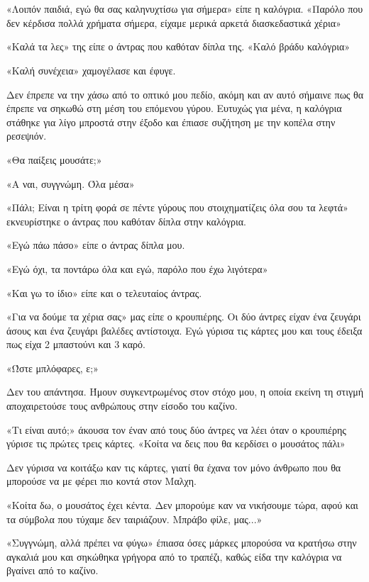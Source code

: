 \documentclass[12pt,twoside, openany]{book}
\begin{document}
\chapter{}

«Λοιπόν παιδιά, εγώ θα σας καληνυχτίσω για σήμερα» είπε η καλόγρια. «Παρόλο που δεν κέρδισα πολλά χρήματα σήμερα, είχαμε μερικά αρκετά διασκεδαστικά χέρια»

«Καλά τα λες» της είπε ο άντρας που καθόταν δίπλα της. «Καλό βράδυ καλόγρια»

«Καλή συνέχεια» χαμογέλασε και έφυγε.

Δεν έπρεπε να την χάσω από το οπτικό μου πεδίο, ακόμη και αν αυτό σήμαινε πως θα έπρεπε να σηκωθώ στη μέση του επόμενου γύρου. Ευτυχώς για μένα, η καλόγρια στάθηκε για λίγο μπροστά στην έξοδο και έπιασε συζήτηση με την κοπέλα στην ρεσεψιόν.

«Θα παίξεις μουσάτε;»

«Α ναι, συγγνώμη. Όλα μέσα»

«Πάλι; Είναι η τρίτη φορά σε πέντε γύρους που στοιχηματίζεις όλα σου τα λεφτά» εκνευρίστηκε ο άντρας που καθόταν δίπλα στην καλόγρια.

«Εγώ πάω πάσο» είπε ο άντρας δίπλα μου.

«Εγώ όχι, τα ποντάρω όλα και εγώ, παρόλο που έχω λιγότερα»

«Και γω το ίδιο» είπε και ο τελευταίος άντρας.

«Για να δούμε τα χέρια σας» μας είπε ο κρουπιέρης. Οι δύο άντρες είχαν ένα ζευγάρι άσους και ένα ζευγάρι βαλέδες αντίστοιχα. Εγώ γύρισα τις κάρτες μου και τους έδειξα πως είχα 2 μπαστούνι και 3 καρό.

«Ώστε μπλόφαρες, ε;»

Δεν του απάντησα. Ήμουν συγκεντρωμένος στον στόχο μου, η οποία εκείνη τη στιγμή αποχαιρετούσε τους ανθρώπους στην είσοδο του καζίνο.

«Τι είναι αυτό;» άκουσα τον έναν από τους δύο άντρες να λέει όταν ο κρουπιέρης γύρισε τις πρώτες τρεις κάρτες. «Κοίτα να δεις που θα κερδίσει ο μουσάτος πάλι»

Δεν γύρισα να κοιτάξω καν τις κάρτες, γιατί θα έχανα τον μόνο άνθρωπο που θα μπορούσε να με φέρει πιο κοντά στον Μαλχη.

«Κοίτα δω, ο μουσάτος έχει κέντα. Δεν μπορούμε καν  να νικήσουμε τώρα, αφού και τα σύμβολα που τύχαμε δεν ταιριάζουν. Μπράβο φίλε, μας...»

«Συγγνώμη, αλλά πρέπει να φύγω» έπιασα όσες μάρκες μπορούσα να κρατήσω στην αγκαλιά μου και σηκώθηκα γρήγορα από το τραπέζι, καθώς είδα την καλόγρια να βγαίνει από το καζίνο.
\end{document}
